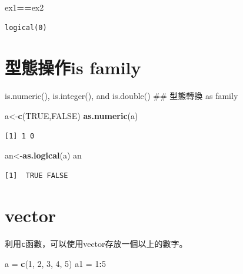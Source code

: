 \documentclass[]{book}
\newenvironment{Shaded}{\begin{snugshade}}{\end{snugshade}}
\newcommand{\DecValTok}[1]{\textcolor[rgb]{0.00,0.00,0.81}{#1}}
\newcommand{\KeywordTok}[1]{\textcolor[rgb]{0.13,0.29,0.53}{\textbf{#1}}}
\newcommand{\NormalTok}[1]{#1}
\newcommand{\OperatorTok}[1]{\textcolor[rgb]{0.81,0.36,0.00}{\textbf{#1}}}
\newcommand{\OtherTok}[1]{\textcolor[rgb]{0.56,0.35,0.01}{#1}}
\newcommand{\StringTok}[1]{\textcolor[rgb]{0.31,0.60,0.02}{#1}}
\theoremstyle{definition}
\theoremstyle{definition}
\theoremstyle{definition}
\theoremstyle{remark}
\begin{document}
\begin{Shaded}
\begin{Highlighting}[]
\NormalTok{ex1}\OperatorTok{==}\NormalTok{ex2}
\end{Highlighting}
\end{Shaded}

\begin{verbatim}
logical(0)
\end{verbatim}

\hypertarget{is-family}{%
\section{型態操作is family}\label{is-family}}

is.numeric(), is.integer(), and is.double() \#\# 型態轉換 as family

\begin{Shaded}
\begin{Highlighting}[]
\NormalTok{a<-}\KeywordTok{c}\NormalTok{(}\OtherTok{TRUE}\NormalTok{,}\OtherTok{FALSE}\NormalTok{)}
\KeywordTok{as.numeric}\NormalTok{(a)}
\end{Highlighting}
\end{Shaded}

\begin{verbatim}
[1] 1 0
\end{verbatim}

\begin{Shaded}
\begin{Highlighting}[]
\NormalTok{an<-}\KeywordTok{as.logical}\NormalTok{(a)}
\NormalTok{an}
\end{Highlighting}
\end{Shaded}

\begin{verbatim}
[1]  TRUE FALSE
\end{verbatim}

\hypertarget{vector}{%
\section{vector}\label{vector}}

利用\texttt{c}函數，可以使用vector存放一個以上的數字。

\begin{Shaded}
\begin{Highlighting}[]
\NormalTok{a =}\StringTok{ }\KeywordTok{c}\NormalTok{(}\DecValTok{1}\NormalTok{, }\DecValTok{2}\NormalTok{, }\DecValTok{3}\NormalTok{, }\DecValTok{4}\NormalTok{, }\DecValTok{5}\NormalTok{)}
\NormalTok{a1 =}\StringTok{ }\DecValTok{1}\OperatorTok{:}\DecValTok{5}
\end{Highlighting}
\end{Shaded}
\end{document}
